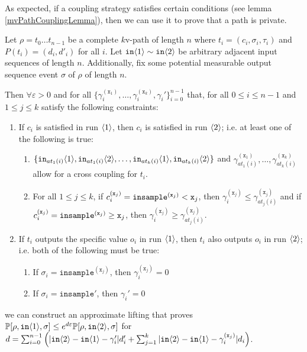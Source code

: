 As expected, if a coupling strategy satisfies certain conditions (see lemma \ref{mvPathCouplingLemma}), then we can use it to prove that a path is private. 

\begin{lemma}\label{mvPathCouplingLemma}
    Let $\rho = t_0\ldots t_{n-1}$ be a complete $k$v-path of length $n$ where $t_i = (c_i, \sigma_i, \tau_i)$ and $P(t_i) = (d_i, d'_i)$ for all $i$. 
    Let $\texttt{in}\brangle{1}\sim \texttt{in}\brangle{2}$ be arbitrary adjacent input sequences of length $n$. Additionally, fix some potential measurable output sequence event $\sigma$ of $\rho$ of length $n$.

    Then $\forall \varepsilon>0$ and for all $\{\gamma_i^{(\texttt{x}_1)},\ldots, \gamma_i^{(\texttt{x}_k)}, \gamma_i'\}_{i=0}^{n-1}$ that, for all $0\leq i\leq n-1$ and $1\leq j\leq k$ satisfy the following constraints:\begin{enumerate}
        \item If $c_i$ is satisfied in run $\brangle{1}$, then $c_i$ is satisfied in run $\brangle{2}$; i.e. at least one of the following is true:\begin{enumerate}
            \item $\{\texttt{in}_{at_1(i)}\brangle{1}, \texttt{in}_{at_1(i)}\brangle{2}, \ldots, \texttt{in}_{at_k(i)}\brangle{1}, \texttt{in}_{at_k(i)}\brangle{2}\}$ and $\gamma_{at_1(i)}^{(\texttt{x}_1)}, \ldots, \gamma_{at_k(i)}^{(\texttt{x}_k)}$ allow for a cross coupling for $t_i$.
            \item For all $1\leq j \leq k$, if $c_i^{(\texttt{x}_j)} = \mvlguard[\texttt{x}_j]$, then $\gamma_i^{(\texttt{x}_j)}\leq \gamma^{(\texttt{x}_j)}_{at_j(i)}$ and if $c_i^{(\texttt{x}_j)} = \mvgguard[\texttt{x}_j]$, then $\gamma_i^{(\texttt{x}_j)}\geq \gamma^{(\texttt{x}_j)}_{at_j(i)}$.
        \end{enumerate}
        \item If $t_i$ outputs the specific value $o_i$ in run $\brangle{1}$, then $t_i$ also outputs $o_i$ in run $\brangle{2}$; i.e. both of the following must be true: \begin{enumerate}
            \item If $\sigma_i = \texttt{insample}^{(\texttt{x}_j)}$, then $\gamma_i^{(\texttt{x}_j)}=0$
            \item If $\sigma_i = \texttt{insample}'$, then $\gamma_i'=0$
        \end{enumerate}
    \end{enumerate}
     we can construct an approximate lifting that proves $\PP[\rho, \texttt{in}\brangle{1}, \sigma]\leq e^{d\varepsilon}\PP[\rho, \texttt{in}\brangle{2}, \sigma]$ for $d = \sum_{i=0}^{n-1}\left(|\texttt{in}\brangle{2}-\texttt{in}\brangle{1}-\gamma_i'|d_i'+\sum_{j=1}^k|\texttt{in}\brangle{2}-\texttt{in}\brangle{1}-\gamma_i^{(\texttt{x}_j)}|d_i\right)$.
\end{lemma}


